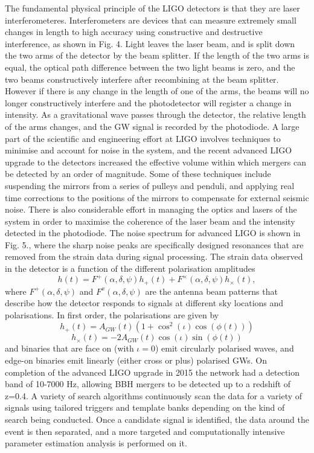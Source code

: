 \documentclass[]{article}
\begin{document}
The fundamental physical principle of the LIGO detectors is that they are laser interferometeres. Interferometers are devices that can measure extremely small changes in length to high accuracy using constructive and destructive interference, as shown in Fig. 4. Light leaves the laser beam, and is split down the two arms of the detector by the beam splitter. If the length of the two arms is equal, the optical path difference between the two light beams is zero, and the two beams constructively interfere after recombining at the beam splitter. However if there is any change in the length of one of the arms, the beams will no longer constructively interfere and the photodetector will register a change in intensity. As a gravitational wave passes through the detector, the relative length of the arms changes, and the GW signal is recorded by the photodiode. A large part of the scientific and engineering effort at LIGO involves techniques to minimise and account for noise in the system, and the recent advanced LIGO upgrade to the detectors increased the effective volume within which mergers can be detected by an order of magnitude\cite{noise}\cite{noise2}. Some of these techniques include suspending the mirrors from a series of pulleys and penduli, and applying real time corrections to the positions of the mirrors to compensate for external seismic noise. There is also considerable effort in managing the optics and lasers of the system in order to maximise the coherence of the laser beam and the intensity detected in the photodiode\cite{lasers}. The noise spectrum for advanced LIGO is shown in Fig. 5.\cite{noise3}, where the sharp noise peaks are specifically designed resonances that are removed from the strain data during signal processing. The strain data observed in the detector is a function of the different polarisation amplitudes
\begin{equation}
h(t)=F^{+}(\alpha,\delta,\psi)h_+(t)+F^{\times}(\alpha,\delta,\psi)h_\times(t),
\end{equation}
where $F^{+}(\alpha,\delta,\psi)$ and $F^{x}(\alpha,\delta,\psi)$ are the antenna beam patterns that describe how the detector responds to signals at different sky locations and polarisations\cite{beampat}. In first order, the polarisations are given by
\begin{equation}
h_+(t)=A_{GW}(t)(1+\cos^2(\iota)\cos(\phi(t)))
\end{equation}
\begin{equation}
h_\times(t)=-2A_{GW}(t)\cos(\iota)\sin(\phi(t))
\end{equation}
and binaries that are face on (with $\iota=0$) emit circularly polarised waves, and edge-on binaries emit linearly (either cross or plus) polarised GWs. On completion of the advanced LIGO upgrade in 2015 the network had a detection band of 10-7000 Hz, allowing BBH mergers to be detected up to a redshift of z=0.4\cite{lasers}. A variety of search algorithms continuously scan the data for a variety of signals\cite{search1}\cite{search2} using tailored triggers and template banks depending on the kind of search being conducted. Once a candidate signal is identified, the data around the event is then separated, and a more targeted and computationally intensive parameter estimation analysis is performed on it.
\end{document}
